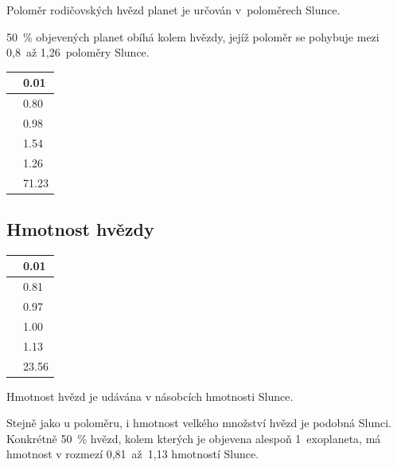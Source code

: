 \documentclass[a4paper,12pt]{article}
\begin{document}
\setlength{\columnsep}{0.43\textwidth}
\begin{multicols}{2}
\begin{minipage}{0.7\textwidth}
Poloměr rodičovských hvězd planet je určován v~poloměrech Slunce.

50~\% objevených planet obíhá kolem hvězdy, jejíž poloměr se pohybuje mezi 0,8~až 1,26~poloměry Slunce.
\end{minipage}
\begin{minipage}{0.3\textwidth}
\begin{tabular}{| l| l|}
   \hline
{\cellcolor[rgb]{0.85, 0.85, 0.85}{ Min }} & 0.01 \\ 
   \hline
{\cellcolor[rgb]{0.85, 0.85, 0.85}{ Qu1 }} & 0.80 \\ 
   \hline
{\cellcolor[rgb]{0.85, 0.85, 0.85}{ Median }} & 0.98 \\ 
   \hline
{\cellcolor[rgb]{0.85, 0.85, 0.85}{ Mean }} & 1.54 \\ 
   \hline
{\cellcolor[rgb]{0.85, 0.85, 0.85}{ Qu3 }} & 1.26 \\ 
   \hline
{\cellcolor[rgb]{0.85, 0.85, 0.85}{ Max }} & 71.23 \\ 
   \hline
\end{tabular}\end{minipage}
\end{multicols}

\subsection{Hmotnost hvězdy}

\setlength{\columnsep}{0\textwidth}
\begin{multicols}{2}
\begin{minipage}{0.3\textwidth}
\begin{tabular}{| l| l|}
   \hline
{\cellcolor[rgb]{0.85, 0.85, 0.85}{ Min }} & 0.01 \\ 
   \hline
{\cellcolor[rgb]{0.85, 0.85, 0.85}{ Qu1 }} & 0.81 \\ 
   \hline
{\cellcolor[rgb]{0.85, 0.85, 0.85}{ Median }} & 0.97 \\ 
   \hline
{\cellcolor[rgb]{0.85, 0.85, 0.85}{ Mean }} & 1.00 \\ 
   \hline
{\cellcolor[rgb]{0.85, 0.85, 0.85}{ Qu3 }} & 1.13 \\ 
   \hline
{\cellcolor[rgb]{0.85, 0.85, 0.85}{ Max }} & 23.56 \\ 
   \hline
\end{tabular}\end{minipage}
\begin{minipage}{0.7\textwidth}
Hmotnost hvězd je udávána v násobcích hmotnosti Slunce.

Stejně jako u poloměru, i hmotnost velkého množství hvězd je podobná Slunci. Konkrétně 50~\% hvězd, kolem kterých je objevena alespoň 1~exoplaneta, má hmotnost v rozmezí 0,81~až~1,13 hmotností Slunce.
\end{minipage}
\end{multicols}
\end{document}
